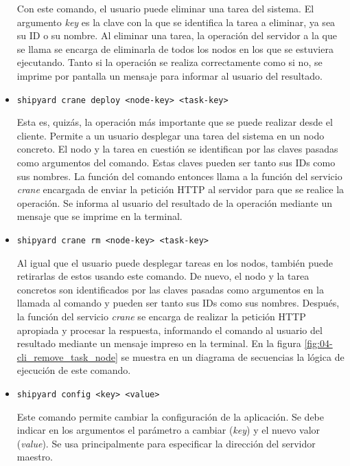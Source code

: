 \begin{itemize}
          Con este comando, el usuario puede eliminar una tarea del sistema. El
          argumento \textit{key} es la clave con la que se identifica la tarea a
          eliminar, ya sea su ID o su nombre. Al eliminar una tarea, la operación
          del servidor a la que se llama se encarga de eliminarla de todos los
          nodos en los que se estuviera ejecutando. Tanto si la operación se
          realiza correctamente como si no, se imprime por pantalla un mensaje
          para informar al usuario del resultado.

    \item \lstinline{shipyard crane deploy <node-key> <task-key>}

          Esta es, quizás, la operación más importante que se puede realizar desde
          el cliente. Permite a un usuario desplegar una tarea del sistema en un
          nodo concreto. El nodo y la tarea en cuestión se identifican por las
          claves pasadas como argumentos del comando. Estas claves pueden ser
          tanto sus IDs como sus nombres. La función del comando entonces llama a
          la función del servicio \textit{crane} encargada de enviar la petición
          HTTP al servidor para que se realice la operación. Se informa al usuario
          del resultado de la operación mediante un mensaje que se imprime en la
          terminal.

    \item \lstinline{shipyard crane rm <node-key> <task-key>}

          Al igual que el usuario puede desplegar tareas en los nodos, también
          puede retirarlas de estos usando este comando. De nuevo, el nodo y la
          tarea concretos son identificados por las claves pasadas como argumentos
          en la llamada al comando y pueden ser tanto sus IDs como sus nombres.
          Después, la función del servicio \textit{crane} se encarga de realizar
          la petición HTTP apropiada y procesar la respuesta, informando el
          comando al usuario del resultado mediante un mensaje impreso en la
          terminal. En la figura \ref{fig:04-cli_remove_task_node} se muestra en
          un diagrama de secuencias la lógica de ejecución de este comando.

    \item \lstinline{shipyard config <key> <value>}

          Este comando permite cambiar la configuración de la aplicación. Se
          debe indicar en los argumentos el parámetro a cambiar (\textit{key}) y
          el nuevo valor (\textit{value}). Se usa principalmente para
          especificar la dirección del servidor maestro.
\end{itemize}

